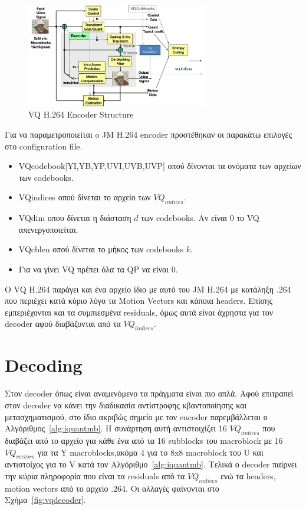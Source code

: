 \begin{figure}[H]
  \centering
  \includegraphics[width=0.7\textwidth]{chapter5/vqencoder.jpg}
  \caption{VQ H.264 Encoder Structure}
  \label{fig:vqencoder}
\end{figure}


\indent Για να παραμετροποιείται o JM Η.264 encoder προστέθηκαν οι παρακάτω επιλογές στο configuration file.

\begin{itemize}
    \item VQcodebook[YI,YB,YP,UVI,UVB,UVP] οπού δίνονται τα ονόματα των αρχείων των codebooks.
    \item VQindices οπού δίνεται το αρχείο των $VQ_{indices}$.
    \item VQdim οπου δίνεται η διάσταση $d$ των codebooks. Αν είναι 0 το VQ απενεργοποιείται.
    \item VQcblen οπού δίνεται το μήκος των codebooks $k$.
    \item Για να γίνει VQ πρέπει όλα τα QP να είναι 0.
\end{itemize}

\indent Ο VQ H.264 παράγει και ένα αρχείο ίδιο με αυτό του JM H.264 με κατάληξη .264 που περιέχει κατά κύριο λόγο τα Motion Vectors και κάποια headers. Επίσης εμπεριέχονται και τα συμπιεσμένα residuals, όμως  αυτά είναι άχρηστα για τον decoder αφού διαβάζονται από τα $VQ_{indices}$.

\section{Decoding}
\label{section:sect53}

\indent Στον decoder όπως είναι αναμενόμενο τα πράγματα είναι πιο απλά. Αφού επιτραπεί στον decoder να κάνει την διαδικασία αντίστροφης κβαντοποίησης και μετασχηματισμού, στο ίδιο ακριβώς σημείο με τον encoder παρεμβάλλεται ο Αλγόριθμος~\ref{alg:iquantmb}. Η συνάρτηση αυτή αντιστοιχίζει 16 $VQ_{indices}$ που διαβάζει από το αρχείο για κάθε ένα από τα 16 subblocks του macroblock με 16 $VQ_{vectors}$ για τα Y macroblocks,ακόμα 4 για το 8x8 macroblock του U και αντιστοίχος για το V κατά τον Αλγόριθμο~\ref{alg:iquantmb}. Τελικά ο decoder παίρνει την κύρια πληροφορία που είναι τα residuals από τα $VQ_{indices}$ ενώ τα headers, motion vectors από το αρχείο .264. Οι αλλαγές φαίνονται στο Σχήμα~\ref{fig:vqdecoder}.



